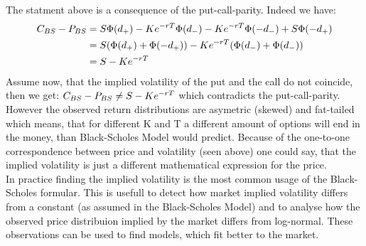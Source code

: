 The statment above is a consequence of the put-call-parity. Indeed we have:
\begin{align*}
C_{BS}-P_{BS}&=S\Phi(d_+)-Ke^{-rT}\Phi(d_-)-Ke^{-rT}\Phi(-d_-)+S\Phi(-d_+)\\
&=S(\Phi(d_+)+\Phi(-d_+))-Ke^{-rT}(\Phi(d_-)+\Phi(d_-))\\
&=S-Ke^{-rT}
\end{align*}
Assume now, that the implied volatility of the put and the call do not coincide, then we get:
$C_{BS}-P_{BS}\neq S-Ke^{-rT}$ which contradicts the put-call-parity.\\
However the observed return distributions are asymetric (skewed) and fat-tailed which means, that for different K and T a different amount of options will end in the money, than Black-Scholes Model would predict. 
Because of the one-to-one correspondence between price and volatility (seen above) one could say, that the implied volatility is just a different mathematical expression for the price.\\
In practice finding the implied volatility is the most common usage of the Black-Scholes formular. This is usefull to detect how market implied volatility differs from a constant (as assumed in the Black-Scholes Model) and to analyse how the observed price distribuion implied by the market differs from log-normal. These observations can be used to find models, which fit better to the market.